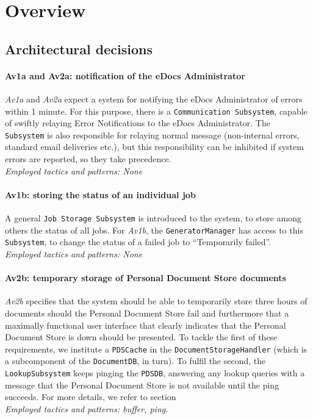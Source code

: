 \section{Overview}\label{sec:overview}
\subsection{Architectural decisions}

\paragraph{Av1a and Av2a: notification of the eDocs Administrator}
\emph{Av1a} and \emph{Av2a} expect a system for notifying the eDocs Administrator of errors within 1 minute. For this purpose, there is a \texttt{Communication Subsystem}, capable of swiftly relaying Error Notifications to the eDocs Administrator. The \texttt{Subsystem} is also responsible for relaying normal message (non-internal errors, standard email deliveries etc.), but this responsibility can be inhibited if system errors are reported, so they take precedence.\\
\emph{Employed tactics and patterns: None}
    
\paragraph{Av1b: storing the status of an individual job}
A general \texttt{Job Storage Subsystem} is introduced to the system, to store among others the status of all jobs. For \emph{Av1b}, the \texttt{GeneratorManager} has access to this \texttt{Subsystem}, to change the status of a failed job to ``Temporarily failed''.\\
\emph{Employed tactics and patterns: None}
    
\paragraph{Av2b: temporary storage of Personal Document Store documents} \emph{Av2b} specifies that the system should be able to temporarily store three hours of documents should the Personal Document Store fail and furthermore that a maximally functional user interface that clearly indicates that the Personal Document Store is down should be presented. To tackle the first of these requirements, we institute a \texttt{PDSCache} in the \texttt{DocumentStorageHandler} (which is a subcomponent of the \texttt{DocumentDB}, in turn). To fulfil the second, the \texttt{LookupSubsystem} keeps pinging the \texttt{PDSDB}, answering any lookup queries with a message that the Personal Document Store is not available until the ping succeeds. For more details, we refer to section \\
\emph{Employed tactics and patterns: buffer, ping.}
    
